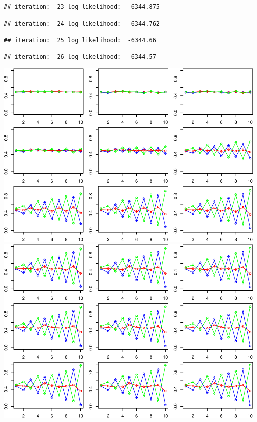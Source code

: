 \documentclass[
]{article}
\begin{document}
\begin{verbatim}
## iteration:  23 log likelihood:  -6344.875
\end{verbatim}

\begin{verbatim}
## iteration:  24 log likelihood:  -6344.762
\end{verbatim}

\begin{verbatim}
## iteration:  25 log likelihood:  -6344.66
\end{verbatim}

\begin{verbatim}
## iteration:  26 log likelihood:  -6344.57
\end{verbatim}

\includegraphics{MLLab1block2-lepeng_files/figure-latex/Assignment2_3-1.pdf}
\includegraphics{MLLab1block2-lepeng_files/figure-latex/Assignment2_3-2.pdf}
\end{document}

